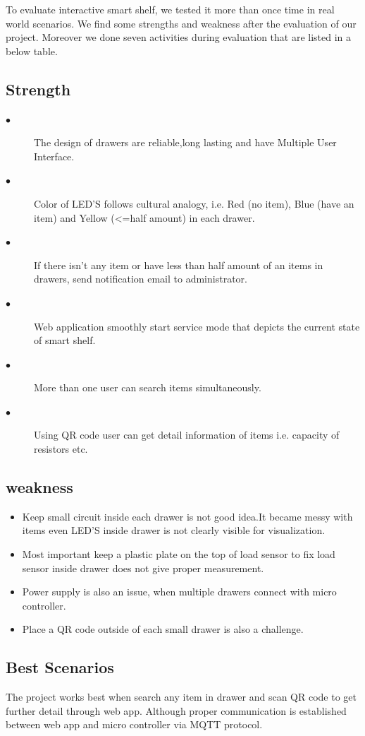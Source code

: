  
To evaluate interactive smart shelf, we tested it more than once time in real world scenarios. We find some strengths and weakness after the evaluation of our project. Moreover we done seven activities during evaluation that are listed in a below table.

\subsection{Strength} 
\begin{description}
  \item[$\bullet$] The design of drawers are reliable,long lasting and have Multiple User Interface.
   \item[$\bullet$] Color of LED'S follows cultural analogy, i.e. Red (no item), Blue (have an item) and Yellow (<=half amount) in each drawer.
   \item[$\bullet$] If there isn't any item or have less than half amount of an items in drawers, send notification email to administrator.
   \item[$\bullet$] Web application smoothly start service mode that depicts the current state of smart shelf.
   \item[$\bullet$] More than one user can search items simultaneously.
   \item[$\bullet$] Using QR code user can get detail information of items i.e. capacity of resistors etc.
   \end{description}
\subsection{weakness}
\begin{itemize}
  \item Keep small circuit inside each drawer is not good idea.It became messy with items even LED'S inside drawer is not clearly visible for visualization.
  \item Most important keep a plastic plate on the top of load sensor to fix load sensor inside drawer does not give proper measurement.
  \item  Power supply is also an issue, when multiple drawers connect with micro controller.
  \item Place a QR code outside of each small drawer is also a challenge.
\end{itemize}
\subsection{Best Scenarios} 
  The project works best when search any item in drawer and scan QR code to get further detail through web app. Although proper communication is established between web app and micro controller via MQTT protocol. 
